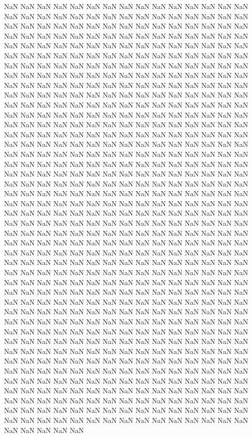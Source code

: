 NaN
NaN
NaN
NaN
NaN
NaN
NaN
NaN
NaN
NaN
NaN
NaN
NaN
NaN
NaN
NaN
NaN
NaN
NaN
NaN
NaN
NaN
NaN
NaN
NaN
NaN
NaN
NaN
NaN
NaN
NaN
NaN
NaN
NaN
NaN
NaN
NaN
NaN
NaN
NaN
NaN
NaN
NaN
NaN
NaN
NaN
NaN
NaN
NaN
NaN
NaN
NaN
NaN
NaN
NaN
NaN
NaN
NaN
NaN
NaN
NaN
NaN
NaN
NaN
NaN
NaN
NaN
NaN
NaN
NaN
NaN
NaN
NaN
NaN
NaN
NaN
NaN
NaN
NaN
NaN
NaN
NaN
NaN
NaN
NaN
NaN
NaN
NaN
NaN
NaN
NaN
NaN
NaN
NaN
NaN
NaN
NaN
NaN
NaN
NaN
NaN
NaN
NaN
NaN
NaN
NaN
NaN
NaN
NaN
NaN
NaN
NaN
NaN
NaN
NaN
NaN
NaN
NaN
NaN
NaN
NaN
NaN
NaN
NaN
NaN
NaN
NaN
NaN
NaN
NaN
NaN
NaN
NaN
NaN
NaN
NaN
NaN
NaN
NaN
NaN
NaN
NaN
NaN
NaN
NaN
NaN
NaN
NaN
NaN
NaN
NaN
NaN
NaN
NaN
NaN
NaN
NaN
NaN
NaN
NaN
NaN
NaN
NaN
NaN
NaN
NaN
NaN
NaN
NaN
NaN
NaN
NaN
NaN
NaN
NaN
NaN
NaN
NaN
NaN
NaN
NaN
NaN
NaN
NaN
NaN
NaN
NaN
NaN
NaN
NaN
NaN
NaN
NaN
NaN
NaN
NaN
NaN
NaN
NaN
NaN
NaN
NaN
NaN
NaN
NaN
NaN
NaN
NaN
NaN
NaN
NaN
NaN
NaN
NaN
NaN
NaN
NaN
NaN
NaN
NaN
NaN
NaN
NaN
NaN
NaN
NaN
NaN
NaN
NaN
NaN
NaN
NaN
NaN
NaN
NaN
NaN
NaN
NaN
NaN
NaN
NaN
NaN
NaN
NaN
NaN
NaN
NaN
NaN
NaN
NaN
NaN
NaN
NaN
NaN
NaN
NaN
NaN
NaN
NaN
NaN
NaN
NaN
NaN
NaN
NaN
NaN
NaN
NaN
NaN
NaN
NaN
NaN
NaN
NaN
NaN
NaN
NaN
NaN
NaN
NaN
NaN
NaN
NaN
NaN
NaN
NaN
NaN
NaN
NaN
NaN
NaN
NaN
NaN
NaN
NaN
NaN
NaN
NaN
NaN
NaN
NaN
NaN
NaN
NaN
NaN
NaN
NaN
NaN
NaN
NaN
NaN
NaN
NaN
NaN
NaN
NaN
NaN
NaN
NaN
NaN
NaN
NaN
NaN
NaN
NaN
NaN
NaN
NaN
NaN
NaN
NaN
NaN
NaN
NaN
NaN
NaN
NaN
NaN
NaN
NaN
NaN
NaN
NaN
NaN
NaN
NaN
NaN
NaN
NaN
NaN
NaN
NaN
NaN
NaN
NaN
NaN
NaN
NaN
NaN
NaN
NaN
NaN
NaN
NaN
NaN
NaN
NaN
NaN
NaN
NaN
NaN
NaN
NaN
NaN
NaN
NaN
NaN
NaN
NaN
NaN
NaN
NaN
NaN
NaN
NaN
NaN
NaN
NaN
NaN
NaN
NaN
NaN
NaN
NaN
NaN
NaN
NaN
NaN
NaN
NaN
NaN
NaN
NaN
NaN
NaN
NaN
NaN
NaN
NaN
NaN
NaN
NaN
NaN
NaN
NaN
NaN
NaN
NaN
NaN
NaN
NaN
NaN
NaN
NaN
NaN
NaN
NaN
NaN
NaN
NaN
NaN
NaN
NaN
NaN
NaN
NaN
NaN
NaN
NaN
NaN
NaN
NaN
NaN
NaN
NaN
NaN
NaN
NaN
NaN
NaN
NaN
NaN
NaN
NaN
NaN
NaN
NaN
NaN
NaN
NaN
NaN
NaN
NaN
NaN
NaN
NaN
NaN
NaN
NaN
NaN
NaN
NaN
NaN
NaN
NaN
NaN
NaN
NaN
NaN
NaN
NaN
NaN
NaN
NaN
NaN
NaN
NaN
NaN
NaN
NaN
NaN
NaN
NaN
NaN
NaN
NaN
NaN
NaN
NaN
NaN
NaN
NaN
NaN
NaN
NaN
NaN
NaN
NaN
NaN
NaN
NaN
NaN
NaN
NaN
NaN
NaN
NaN
NaN
NaN
NaN
NaN
NaN
NaN
NaN
NaN
NaN
NaN
NaN
NaN
NaN
NaN
NaN
NaN
NaN
NaN
NaN
NaN
NaN
NaN
NaN
NaN
NaN
NaN
NaN
NaN
NaN
NaN
NaN
NaN
NaN
NaN
NaN
NaN
NaN
NaN
NaN
NaN
NaN
NaN
NaN
NaN
NaN
NaN
NaN
NaN
NaN
NaN
NaN
NaN
NaN
NaN
NaN
NaN
NaN
NaN
NaN
NaN
NaN
NaN
NaN
NaN
NaN
NaN
NaN
NaN
NaN
NaN
NaN
NaN
NaN
NaN
NaN
NaN
NaN
NaN
NaN
NaN
NaN
NaN
NaN
NaN
NaN
NaN
NaN
NaN
NaN
NaN
NaN
NaN
NaN
NaN
NaN
NaN
NaN
NaN
NaN
NaN
NaN
NaN
NaN
NaN
NaN
NaN
NaN
NaN
NaN
NaN
NaN
NaN
NaN
NaN
NaN
NaN
NaN
NaN
NaN
NaN
NaN
NaN
NaN
NaN
NaN
NaN
NaN
NaN
NaN
NaN
NaN
NaN
NaN

